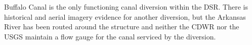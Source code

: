 \begin{linenumbers}[1]
Buffalo Canal is the only functioning canal diversion within the DSR.  There is historical and aerial imagery evidence for another diversion, but the Arkansas River has been routed around the structure and neither the CDWR nor the USGS maintain a flow gauge for the canal serviced by the diversion.

\end{linenumbers}
\clearpage{}